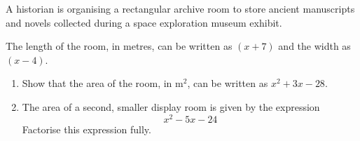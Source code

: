 \begin{question}
\noindent A historian is organising a rectangular archive room to store ancient manuscripts and novels collected during a space exploration museum exhibit.

The length of the room, in metres, can be written as $(x + 7)$ and the width as $(x - 4)$.

\begin{enumerate}
    \item[(a)] Show that the area of the room, in $\text{m}^2$, can be written as $x^2 + 3x - 28$.
    \vspace{3.5cm}

    \item[(b)] The area of a second, smaller display room is given by the expression
    \[ x^2 - 5x - 24 \]
    Factorise this expression fully.
    \vspace{3.5cm}
\end{enumerate}
\end{question}
